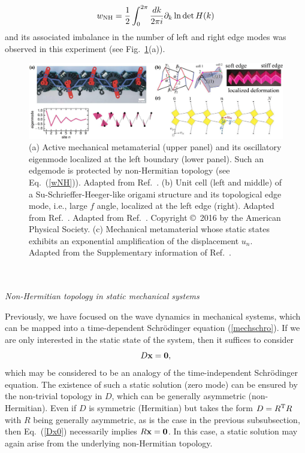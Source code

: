 \documentclass{tADP2e}
\theoremstyle{plain}
\theoremstyle{plain}
\theoremstyle{definition}
\begin{document}
\begin{equation}
w_{\rm NH}=\frac{1}{2}\int^{2\pi}_0\frac{dk}{2\pi i}\partial_k\ln\det H(k)
\label{wNH}
\end{equation}
and its associated imbalance in the number of left and right edge modes was observed in this experiment (see Fig.~\ref{fig:3mech}(a)).
\begin{figure}
\begin{center}
\includegraphics[width=14.5cm]{./Figures/fig_3_mech.pdf}
\end{center}
\caption{(a) Active mechanical metamaterial (upper panel) and its oscillatory eigenmode localized at the left boundary (lower panel). Such an edgemode is protected by non-Hermitian topology (see Eq.~(\ref{wNH})). Adapted from Ref.~\cite{GA19}. (b) Unit cell (left and middle) of a Su-Schrieffer-Heeger-like origami structure and its topological edge mode, i.e., large $f$ angle, localized at the left edge (right). Adapted from Ref.~\cite{CBG16}. Adapted from Ref.~\cite{CBG16}. Copyright \copyright\,   2016 by the American Physical Society. (c) Mechanical metamaterial whose static states exhibits an exponential amplification of the displacement $u_n$. Adapted from the Supplementary information of Ref.~\cite{CC16}.}
\label{fig:3mech}
\end{figure}
\\ \\ {\it Non-Hermitian topology in static mechanical systems}

\vspace{3pt}
\noindent
Previously, we have focused on the wave dynamics in mechanical systems, which can be mapped into a time-dependent Schr\"odinger equation (\ref{mechschro}). If we are only interested in the static state of the system, then it suffices to consider
\begin{equation}
D\bold{x}=\bold{0},
\label{Dx0}
\end{equation}
which may be considered to be an analogy of the time-independent Schr\"odinger equation. The existence of such a static solution (zero mode) can be ensured by the non-trivial topology in $D$, which can be generally asymmetric (non-Hermitian). Even if $D$ is symmetric (Hermitian) but takes the form $D=R^{\rm T}R$ with $R$ being generally asymmetric, as is the case in the previous subsubsection, then Eq.~(\ref{Dx0}) necessarily implies $R\bold{x}=\bold{0}$. In this case, a static solution may again arise from the underlying non-Hermitian topology.
\end{document}
